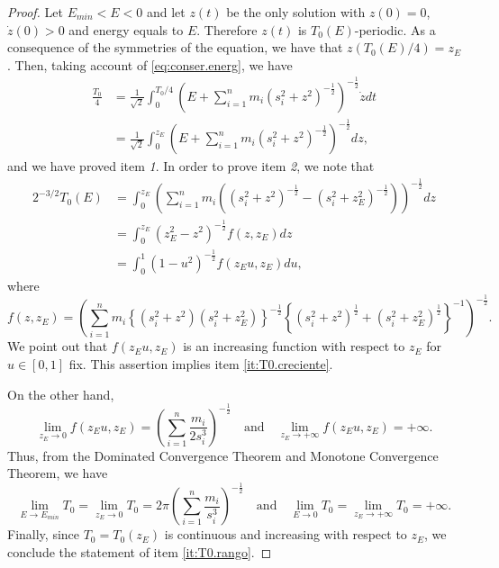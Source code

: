 \documentclass[smallcondensed]{svjour3}
\begin{document}
\begin{proof}
Let $E_{min}<E<0$ and let $z(t)$ be the only solution with $z(0)=0$, $\dot{z}(0)>0$ and energy equals to $E$. Therefore $z(t)$ is $T_0(E)$-periodic. As a consequence of the symmetries of the equation, we have that $z(T_0(E)/4)=z_E$. Then, taking account of \eqref{eq:conser.energ}, we have 
\begin{equation*}
 \begin{split}
  \frac{T_0}{4}&=\frac{1}{\sqrt{2}}\int_0^{T_0/4}\left(E+\sum_{i=1}^n m_i (s_i^2+z^2)^{-\frac12}\right)^{-\frac12} \dot{z} dt\\
  &=\frac{1}{\sqrt{2}}\int_{0}^{z_E} \left(E+\sum_{i=1}^n m_i (s_i^2+z^2)^{-\frac12}\right)^{-\frac12} dz,
 \end{split}
\end{equation*}
and we have proved item \textit{1}. In order to prove item \textit{2}, we note that
\begin{equation*}
 \begin{split}
  2^{-3/2}T_0(E)
  &=
    \int_0^{z_E}\left(\sum_{i=1}^n m_i \left((s_i^2+z^2)^{-\frac12}-(s_i^2+z_E^2)^{-\frac12}\right)\right)^{-\frac12}dz\\
  &=\int_0^{z_E} \left(z_E^2-z^2\right)^{-\frac12} f(z,z_E)dz\\
  &=\int_0^1 \left(1-u^2\right)^{-\frac12} f(z_Eu,z_E)du,
 \end{split}
 \end{equation*}
where \[f(z,z_E)=\left(\sum_{i=1}^n m_i \left\{(s_i^2+z^2)(s_i^2+z_E^2)\right\}^{-\frac12} \left\{(s_i^2+z^2)^{\frac12}+(s_i^2+z_E^2)^{\frac12} \right\}^{-1}\right)^{-\frac12}.\]
We point out that $f(z_Eu,z_E)$ is an increasing function with respect to $z_E$ for $u\in [0,1]$ fix. This assertion implies item \ref{it:T0.creciente}.

On the other hand,
\begin{equation*}
 \lim\limits_{z_E \to 0}f(z_Eu,z_E)=\left(\sum_{i=1}^{n} \frac{m_i}{2s_i^3}\right)^{-\frac12} \quad \text{and}\quad  \lim\limits_{z_E \to +\infty}f(z_Eu,z_E)=+\infty.
\end{equation*}
Thus, from the Dominated Convergence Theorem and Monotone Convergence Theorem, we have 
\[\lim\limits_{E\to E_{min}}T_0=\lim\limits_{z_E\to 0}T_0=2\pi\left(\sum_{i=1}^{n} \frac{m_i}{s_i^3}\right)^{-\frac12}\quad \text{and}\quad \lim\limits_{E\to 0}T_0=\lim\limits_{z_E\to +\infty}T_0=+\infty.\]
Finally,  since $T_0=T_0(z_E)$ is continuous and increasing with respect to $z_E$, we conclude the statement of item \ref{it:T0.rango}.
\end{proof}
\end{document}
